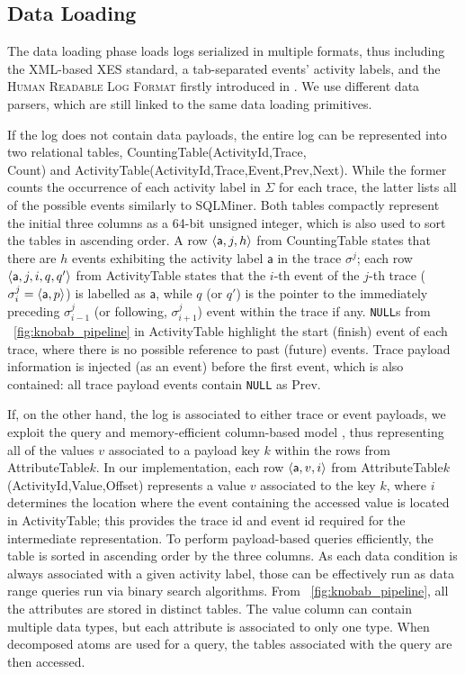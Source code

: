 \subsection{Data Loading}\label{ssec:dl}
The data loading phase   loads logs  serialized in multiple  formats, thus including the XML-based XES standard, a tab-separated events' activity labels, and the \textsc{Human Readable Log Format} firstly introduced in \cite{bpm21}. We use different data parsers, which are still linked to the same data loading primitives. 

If the log does not contain data payloads, the entire log can be represented into two relational tables, \textsf{CountingTable(ActivityId,Trace,\\Count)} and \textsf{ActivityTable(ActivityId,Trace,Event,Prev,Next)}. While the former counts the occurrence of each activity label in $\Sigma$ for each trace, the latter lists all of the possible events similarly to SQLMiner. Both tables compactly represent the initial three columns as a 64-bit unsigned integer, which is also used to sort the tables in ascending order. A row $\braket{\textsf{a},j,h}$ from \textsf{CountingTable} states that there are $h$ events exhibiting the activity label $\textsf{a}$ in the trace $\sigma^j$; each row $\braket{\textsf{a},j,i,q,q'}$ from \textsf{ActivityTable} states that the $i$-th event of the $j$-th trace ($\sigma^j_i=\braket{\textsf{a},p}$) is labelled as $\textsf{a}$, while $q$ (or $q'$) is the pointer to the immediately preceding $\sigma^j_{i-1}$ (or  following, $\sigma^j_{i+1}$) event within the trace if any. \texttt{NULL}s from  \figurename~\ref{fig:knobab_pipeline} in \textsf{ActivityTable} highlight the start (finish) event of each trace, where there is no possible reference to past (future) events. Trace payload information is injected (as an event) before the first event, which is also contained:  all trace payload events contain \texttt{NULL} as \textsf{Prev}. %


If, on the other hand, the log is associated to either trace or event payloads, we exploit 
the query and memory-efficient  column-based model \cite{IdreosGNMMK12}, thus representing all of the values $v$ associated to a  payload key $k$ within the rows from  \textsf{AttributeTable$k$}. In our implementation, each row $\braket{\textsf{a},v,i}$ from  \textsf{AttributeTable$k$(ActivityId,Value,Offset)} represents a value $v$ associated to the key $k$, where $i$ determines the location where the event containing the accessed value is located in \textsf{ActivityTable}; this %
provides the trace id and event id required for the intermediate representation.
 To perform payload-based queries efficiently, the table is sorted in ascending order by the  three columns. As each data condition is always associated with a given activity label, those can be effectively run as data range queries run via binary search algorithms. From \figurename~\ref{fig:knobab_pipeline}, all the attributes are stored in distinct tables. The value column can contain multiple data types, but each attribute is associated to only one type. When decomposed atoms are used for a query, the tables associated with the query are then accessed. %

